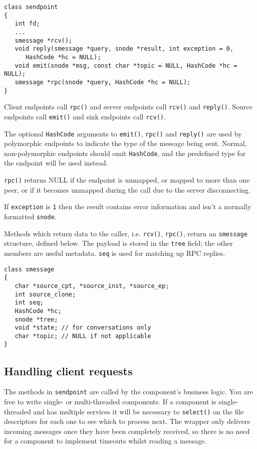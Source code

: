 \documentclass[12pt,a4paper,twoside]{article}
\renewcommand{\_}{\texttt{\symbol{95}}}
\begin{document}
\begin{verbatim}
class sendpoint
{
   int fd;
   ...	
   smessage *rcv();
   void reply(smessage *query, snode *result, int exception = 0,
      HashCode *hc = NULL);
   void emit(snode *msg, const char *topic = NULL, HashCode *hc = NULL);
   smessage *rpc(snode *query, HashCode *hc = NULL);
}
\end{verbatim}

Client endpoints call \verb^rpc()^ and server endpoints
call \verb^rcv()^ and \verb^reply()^.
Source endpoints call \verb^emit()^ and sink endpoints call \verb^rcv()^.

The optional \verb^HashCode^ arguments to \verb^emit()^, \verb^rpc()^
and \verb^reply()^ are used by polymorphic endpoints to indicate the
type of the message being sent. Normal, non-polymorphic endpoints
should omit \verb^HashCode^, and the predefined type for the endpoint
will be used instead.

\verb^rpc()^ returns NULL if the endpoint is unmapped, or mapped to
more than one peer, or if it becomes unmapped during the call due to
the server disconnecting.

If \verb^exception^ is \verb^1^ then the result contains error information
and isn't a normally formatted \verb^snode^.

Methods which return data to the caller, i.e. \verb^rcv()^, \verb^rpc()^,
return an \verb^smessage^ structure, defined below. The payload
is stored in the \verb^tree^ field; the other members are useful
metadata. \verb^seq^ is used for matching up RPC replies.

\begin{verbatim}
class smessage
{
   char *source_cpt, *source_inst, *source_ep;
   int source_clone;
   int seq;
   HashCode *hc;  
   snode *tree;
   void *state; // for conversations only
   char *topic; // NULL if not applicable
}
\end{verbatim}

\subsection{Handling client requests}

The methods in \verb^sendpoint^ are called by the component's
business logic.
You are free to write single- or multi-threaded components.
If a component is single-threaded and has multiple services it
will be necessary to \verb^select()^ on the file descriptors
for each one to see which to process next. The wrapper only
delivers incoming messages once they have been completely
received, so there is no need for
a component to implement timeouts whilst reading a message.
\end{document}
